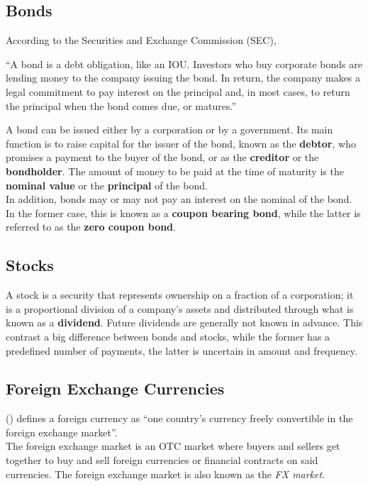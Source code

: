 \documentclass[11pt]{report}
\newcommand{\aycite}[1]{%
 \citeauthor{#1} (\citeyear{#1})}
\begin{document}
\subsection{Bonds}

According to the Securities and Exchange Commission (SEC),
\begin{displayquote}
``A bond is a debt obligation, like an IOU. Investors who buy corporate bonds are lending money to the company issuing the bond. In return, the company makes a legal commitment to pay interest on the principal and, in most cases, to return the principal when the bond comes due, or matures.''
\end{displayquote}

A bond can be issued either by a corporation or by a government. Its main function is to raise capital for the issuer of the bond, known as the \textbf{debtor}, who promises a payment to the buyer of the bond, or as the \textbf{creditor} or the \textbf{bondholder}. The amount of money to be paid at the time of maturity is the \textbf{nominal value} or the \textbf{principal} of the bond.\\

In addition, bonds may or may not pay an interest on the nominal of the bond. In the former case, this is known as a \textbf{coupon bearing bond}, while the latter is referred to as the \textbf{zero coupon bond}.

\subsection{Stocks}
A stock is a security that represents ownership on a fraction of a corporation; it is a proportional division of a company's assets and distributed through what is known as a \textbf{dividend}. Future dividends are generally not known in advance. This contrast a big difference between bonds and stocks, while the former has a predefined number of payments, the latter is uncertain in amount and frequency.

\subsection{Foreign Exchange Currencies}
\aycite{kozy} defines a foreign currency as ``one country's currency freely convertible in the foreign exchange market''.\\

The foreign exchange market is an OTC market where buyers and sellers get together to buy and sell foreign currencies or financial contracts on said currencies. The foreign exchange market is also known as the \textit{FX market}.
\end{document}
